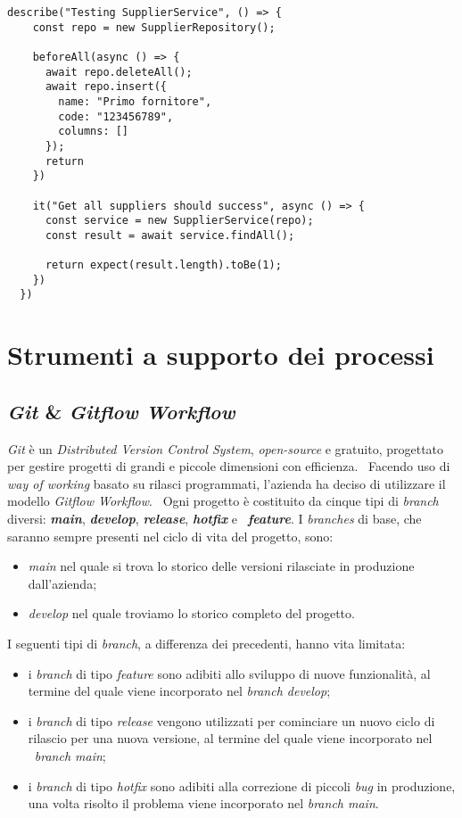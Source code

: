 \newpage
\begin{lstlisting}[caption=Esempio di \emph{test}, label={code:test}, captionpos=b]
  describe("Testing SupplierService", () => {
    const repo = new SupplierRepository();

    beforeAll(async () => {
      await repo.deleteAll();
      await repo.insert({
        name: "Primo fornitore",
        code: "123456789",
        columns: []
      });
      return 
    })

    it("Get all suppliers should success", async () => {
      const service = new SupplierService(repo);
      const result = await service.findAll();

      return expect(result.length).toBe(1);
    })
  })
\end{lstlisting}

\section{Strumenti a supporto dei processi}

\subsection{\emph{Git} \& \emph{Gitflow Workflow}}
\emph{Git} è un \emph{Distributed Version Control System}, \emph{open-source} e gratuito, progettato per gestire progetti di grandi e piccole dimensioni con efficienza. \
Facendo uso di \emph{way of working} basato su rilasci programmati, l'azienda ha deciso di utilizzare il modello \emph{Gitflow Workflow}. \
Ogni progetto è costituito da cinque tipi di \emph{branch} diversi: \textbf{\emph{main}}, \textbf{\emph{develop}}, \textbf{\emph{release}}, \textbf{\emph{hotfix}} e \
\textbf{\emph{feature}}. I \emph{branches} di base, che saranno sempre presenti nel ciclo di vita del progetto, sono:
\begin{itemize}
  \item \emph{main} nel quale si trova lo storico delle versioni rilasciate in produzione dall'azienda;
  \item \emph{develop} nel quale troviamo lo storico completo del progetto. 
\end{itemize}  

I seguenti tipi di \emph{branch}, a differenza dei precedenti, hanno vita limitata: \
\begin{itemize}
  \item i \emph{branch} di tipo \emph{feature} sono adibiti allo sviluppo di nuove funzionalità, al termine del quale viene incorporato nel \emph{branch develop}; 
  \item i \emph{branch} di tipo \emph{release} vengono utilizzati per cominciare un nuovo ciclo di rilascio per una nuova versione, al termine del quale viene incorporato nel \
  \emph{branch main}; 
  \item i \emph{branch} di tipo \emph{hotfix} sono adibiti alla correzione di piccoli \emph{bug} in produzione, una volta risolto il problema viene incorporato nel \emph{branch main}.
\end{itemize}

